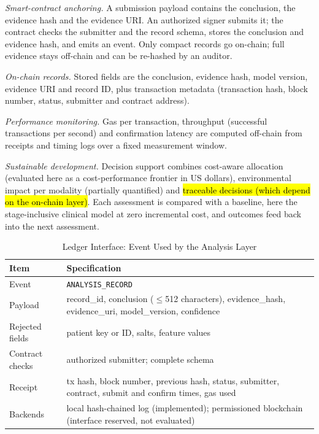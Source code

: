 \documentclass[journal,twoside,web]{IEEEtran}
\newcommand{\bc}[1]{\hl{#1}}
\newcommand{\bct}[1]{\texorpdfstring{\colorbox{chainbg}{#1}}{#1}}
\newcommand{\bc}[1]{#1}
\newcommand{\bct}[1]{#1}
\begin{document}
\begin{chainbox}
\textit{Smart-contract anchoring.} A submission payload contains the conclusion, the evidence hash and the evidence URI. An authorized signer submits it; the contract checks the submitter and the record schema, stores the conclusion and evidence hash, and emits an event. Only compact records go on-chain; full evidence stays off-chain and can be re-hashed by an auditor.

\textit{On-chain records.} Stored fields are the conclusion, evidence hash, model version, evidence URI and record ID, plus transaction metadata (transaction hash, block number, status, submitter and contract address).

\textit{Performance monitoring.} Gas per transaction, throughput (successful transactions per second) and confirmation latency are computed off-chain from receipts and timing logs over a fixed measurement window.
\end{chainbox}

\textit{Sustainable development.} Decision support combines cost-aware allocation (evaluated here as a cost-performance frontier in US dollars), environmental impact per modality (partially quantified) and \bc{traceable decisions (which depend on the on-chain layer)}. Each assessment is compared with a baseline, here the stage-inclusive clinical model at zero incremental cost, and outcomes feed back into the next assessment.

\begin{table}[t]
\centering
\caption{\bct{Ledger Interface: Event Used by the Analysis Layer}}
\label{tab:iface}
\setlength{\tabcolsep}{3pt}
\begin{tabular}{@{}>{\raggedright}p{2.0cm}>{\raggedright\arraybackslash}p{6.1cm}@{}}
\toprule
Item & Specification \\
\midrule
Event & \texttt{ANALYSIS\_RECORD} \\
Payload & record\_id, conclusion ($\le$512 characters), evidence\_hash, evidence\_uri, model\_version, confidence \\
Rejected fields & patient key or ID, salts, feature values \\
Contract checks & authorized submitter; complete schema \\
Receipt & tx hash, block number, previous hash, status, submitter, contract, submit and confirm times, gas used \\
Backends & local hash-chained log (implemented); permissioned blockchain (interface reserved, not evaluated) \\
\bottomrule
\end{tabular}
\end{table}
\end{document}
